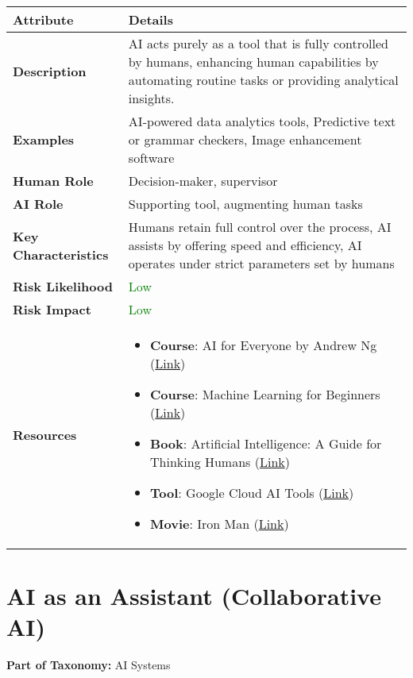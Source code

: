 \documentclass{article}
\begin{document}
\begin{longtable}{|p{4cm}|p{10cm}|}
\hline
\textbf{Attribute} & \textbf{Details} \\
\hline
\textbf{Description} & AI acts purely as a tool that is fully controlled by humans, enhancing human capabilities by automating routine tasks or providing analytical insights. \\
\hline
\textbf{Examples} & AI-powered data analytics tools, Predictive text or grammar checkers, Image enhancement software \\
\hline
\textbf{Human Role} & Decision-maker, supervisor \\
\hline
\textbf{AI Role} & Supporting tool, augmenting human tasks \\
\hline
\textbf{Key Characteristics} & Humans retain full control over the process, AI assists by offering speed and efficiency, AI operates under strict parameters set by humans \\
\hline
\textbf{Risk Likelihood} & \textcolor{green}{Low} \\
\hline
\textbf{Risk Impact} & \textcolor{green}{Low} \\
\hline
\textbf{Resources} & \begin{itemize}
  \item \textbf{Course}: AI for Everyone by Andrew Ng (\href{https://www.coursera.org/learn/ai-for-everyone}{Link})
  \item \textbf{Course}: Machine Learning for Beginners (\href{https://learn.microsoft.com/en-us/training/paths/ml-for-beginners/}{Link})
  \item \textbf{Book}: Artificial Intelligence: A Guide for Thinking Humans (\href{https://www.amazon.com/dp/1250770742}{Link})
  \item \textbf{Tool}: Google Cloud AI Tools (\href{https://cloud.google.com/products/ai}{Link})
  \item \textbf{Movie}: Iron Man (\href{https://www.imdb.com/title/tt0371746/}{Link})
\end{itemize} \\ \hline
\end{longtable}

\newpage
\section*{AI as an Assistant (Collaborative AI)}
\noindent \textbf{Part of Taxonomy:} AI Systems
\end{document}
